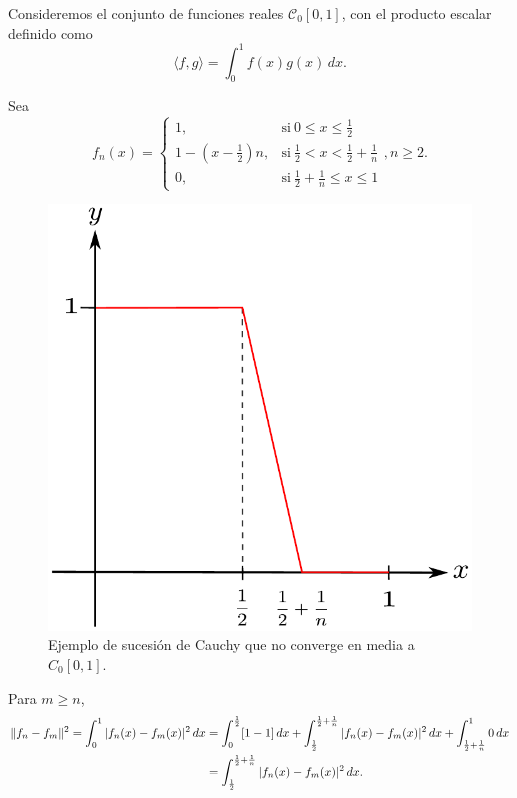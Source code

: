 \begin{ejemplo}
Consideremos el conjunto de funciones reales 
 $\mathcal{C}_0[0,1]$, con el producto escalar definido como 
$$\langle f,g\rangle = \int_0^1 f(x) g(x) \,dx.$$

Sea  
\begin{equation*}
    f_n(x) = \left\{ \begin{array}{cl}
       1,  & \mbox{si} ~ 0 \leq x \leq \frac{1}{2}\\
    1 - \left(x - \frac{1}{2} \right)n,     & \mbox{si}  ~ \frac{1}{2} < x < \frac{1}{2} + \frac{1}{n} \\
    0, & \mbox{si} ~ \frac{1}{2} + \frac{1}{n} \leq x \leq 1
    \end{array} \right., n \geq 2.
\end{equation*}

\begin{figure}[H]
    \centering
    \includegraphics[scale = 0.5]{Figuras/EjemploCauchy.pdf}
    \caption{Ejemplo de sucesión de Cauchy que no converge en media a $C_0[0,1]$.}
\end{figure}

Para $m \geq n$, 
\begin{align*}
    \lVert f_n - f_m\rVert^2 = \int_0^1 |f_n(x) - f_m(x)|^2 \,dx &= \int_0^{\frac{1}{2}} [1-1] \,dx + \int_{\frac{1}{2}}^{\frac{1}{2} + \frac{1}{n}} |f_n(x) - f_m(x)|^2 \,dx + \int_{\frac{1}{2} + \frac{1}{n}}^1 0 \, dx \\
    &=  \int_{\frac{1}{2}}^{\frac{1}{2} + \frac{1}{n}} |f_n(x) - f_m(x)|^2 \,dx.
\end{align*}


\end{ejemplo}

